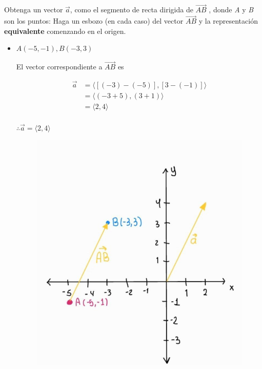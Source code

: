 \documentclass[12pt]{article}
\begin{document}
\section{}

Obtenga un vector $\vec{a}$, como el segmento de recta dirigida de $\vec{AB}$ , donde \textit{A} y \textit{B} son los puntos:
Haga un esbozo (en cada caso) del vector $\vec{AB}$ y la representación \textbf{equivalente} comenzando en el origen.
\begin{itemize}
  
\item $A(-5,-1) , B(-3,3)$

  El vector correspondiente a $\vec{AB}$ es

  \begin{align*}
    \vec{a}
    &=
    \langle
    [(-3)-(-5)],
    [3-(-1)]
    \rangle \\
    &=
    \langle
    (-3+5),
    (3+1)
    \rangle \\
    &=
    \langle
    2,
    4
    \rangle \\
  \end{align*}

  $\therefore \vec{a} = \langle 2, 4 \rangle$

  \begin{figure}[H]
    \centering
    \includegraphics[width=1\textwidth]{./img/vecr2.jpeg}
  \end{figure}
\\


\end{itemize}
\end{document}
